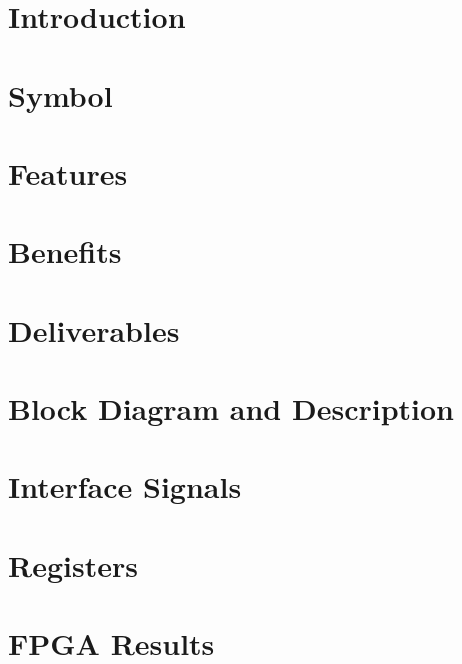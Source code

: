 \documentclass{../../submodules/TEX/document/ug/ug}
\begin{document}
\maketitle
\cleardoublepage
\tableofcontents
\listoftables
\listoffigures
\cleardoublepage

\section{Introduction}


\section{Symbol}


\section{\textcolor[rgb]{0,0,0}{Features}}


\section{\textcolor[rgb]{0,0,0}{Benefits}}


\section{\textcolor[rgb]{0,0,0}{Deliverables}}


\section{\textcolor[rgb]{0,0,0}{Block Diagram and Description}}


%

\section{Interface Signals}


\section{Registers}


\section{\textcolor[rgb]{0,0,0}{FPGA Results}}

\clearpage

%
%
\end{document}
